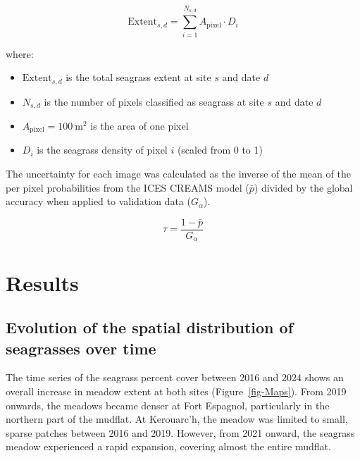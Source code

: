 \documentclass[
  number]{elsarticle}
\providecommand{\tightlist}{%
  \setlength{\itemsep}{0pt}\setlength{\parskip}{0pt}}
\begin{document}
\[
\text{Extent}_{s,d} = \sum_{i=1}^{N_{s,d}} A_{\text{pixel}} \cdot D_i
\]

where:

\begin{itemize}
\tightlist
\item
  \(\text{Extent}_{s,d}\) is the total seagrass extent at site \(s\) and
  date \(d\)\\
\item
  \(N_{s,d}\) is the number of pixels classified as seagrass at site
  \(s\) and date \(d\)\\
\item
  \(A_{\text{pixel}} = 100\ \text{m}^2\) is the area of one pixel\\
\item
  \(D_i\) is the seagrass density of pixel \(i\) (scaled from 0 to 1)
\end{itemize}

The uncertainty for each image was calculated as the inverse of the mean
of the per pixel probabilities from the ICES CREAMS model (\(\bar{p}\))
divided by the global accuracy when applied to validation data
(\(G_{\alpha}\)).

\[
\tau = \frac{1 - \bar{p}}{G_{\alpha}}
\]

\section{Results}\label{results}

\subsection{Evolution of the spatial distribution of seagrasses over
time}\label{evolution-of-the-spatial-distribution-of-seagrasses-over-time}

The time series of the seagrass percent cover between 2016 and 2024
shows an overall increase in meadow extent at both sites
(Figure~\ref{fig-Maps}). From 2019 onwards, the meadows became denser at
Fort Espagnol, particularly in the northern part of the mudflat. At
Kerouarc'h, the meadow was limited to small, sparse patches between 2016
and 2019. However, from 2021 onward, the seagrass meadow experienced a
rapid expansion, covering almost the entire mudflat.
\end{document}
